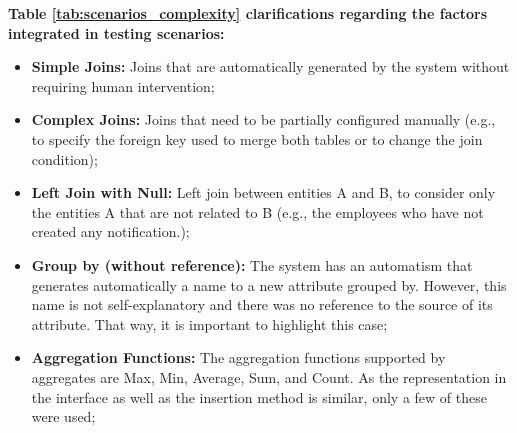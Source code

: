



\textbf{Table \ref{tab:scenarios_complexity} clarifications regarding the factors integrated in testing scenarios: }
\begin{itemize}
    \item \textbf{Simple Joins: }Joins that are automatically generated by the system without requiring human intervention;
    \item \textbf{Complex Joins: }Joins that need to be partially configured manually (e.g., to specify the foreign key used to merge both tables or to change the join condition);
    \item \textbf{Left Join with Null: }Left join between entities A and B, to consider only the entities A that are not related to B (e.g., the employees who have not created any notification.);
    \item \textbf{Group by (without reference): } The system has an automatism that generates automatically a name to a new attribute grouped by. However, this name is not self-explanatory and there was no reference to the source of its attribute. That way, it is important to highlight this case;
    \item \textbf{Aggregation Functions: } The aggregation functions supported by aggregates are Max, Min, Average, Sum, and Count. As the representation in the interface as well as the insertion method is similar, only a few of these were used;
\end{itemize}


